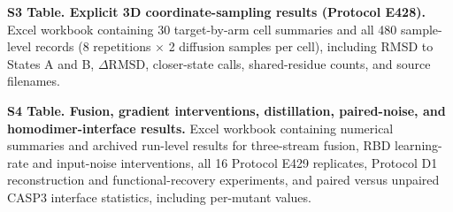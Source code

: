 \textbf{S3 Table. Explicit 3D coordinate-sampling results (Protocol E428).}
Excel workbook containing 30 target-by-arm cell summaries and all 480 sample-level records (8 repetitions $\times$ 2 diffusion samples per cell), including RMSD to States A and B, $\Delta\mathrm{RMSD}$, closer-state calls, shared-residue counts, and source filenames.

\textbf{S4 Table. Fusion, gradient interventions, distillation, paired-noise, and homodimer-interface results.}
Excel workbook containing numerical summaries and archived run-level results for three-stream fusion, RBD learning-rate and input-noise interventions, all 16 Protocol E429 replicates, Protocol D1 reconstruction and functional-recovery experiments, and paired versus unpaired CASP3 interface statistics, including per-mutant values.

